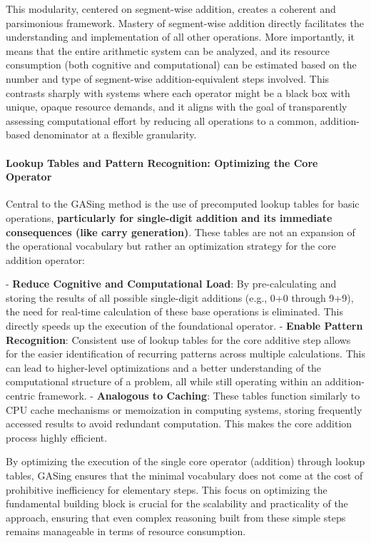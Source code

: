 This modularity, centered on segment-wise addition, creates a coherent and parsimonious framework. Mastery of segment-wise addition directly facilitates the understanding and implementation of all other operations. More importantly, it means that the entire arithmetic system can be analyzed, and its resource consumption (both cognitive and computational) can be estimated based on the number and type of segment-wise addition-equivalent steps involved. This contrasts sharply with systems where each operator might be a black box with unique, opaque resource demands, and it aligns with the goal of transparently assessing computational effort by reducing all operations to a common, addition-based denominator at a flexible granularity.
\paragraph{Lookup Tables and Pattern Recognition: Optimizing the Core Operator}

Central to the GASing method is the use of precomputed lookup tables for basic operations, \textbf{particularly for single-digit addition and its immediate consequences (like carry generation)}. These tables are not an expansion of the operational vocabulary but rather an optimization strategy for the core addition operator:

-   \textbf{Reduce Cognitive and Computational Load}: By pre-calculating and storing the results of all possible single-digit additions (e.g., 0+0 through 9+9), the need for real-time calculation of these base operations is eliminated. This directly speeds up the execution of the foundational operator.
-   \textbf{Enable Pattern Recognition}: Consistent use of lookup tables for the core additive step allows for the easier identification of recurring patterns across multiple calculations. This can lead to higher-level optimizations and a better understanding of the computational structure of a problem, all while still operating within an addition-centric framework.
-   \textbf{Analogous to Caching}: These tables function similarly to CPU cache mechanisms or memoization in computing systems, storing frequently accessed results to avoid redundant computation. This makes the core addition process highly efficient.

By optimizing the execution of the single core operator (addition) through lookup tables, GASing ensures that the minimal vocabulary does not come at the cost of prohibitive inefficiency for elementary steps. This focus on optimizing the fundamental building block is crucial for the scalability and practicality of the approach, ensuring that even complex reasoning built from these simple steps remains manageable in terms of resource consumption.

